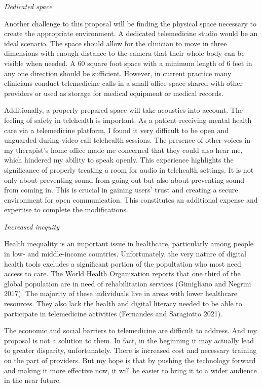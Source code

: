 \documentclass[
  letterpaper,
  DIV=11,
  numbers=noendperiod,
  oneside]{scrartcl}
\begin{document}
\emph{Dedicated space}

Another challenge to this proposal will be finding the physical space
necessary to create the appropriate environment. A dedicated
telemedicine studio would be an ideal scenario. The space should allow
for the clinician to move in three dimensions with enough distance to
the camera that their whole body can be visible when needed. A 60 square
foot space with a minimum length of 6 feet in any one direction should
be sufficient. However, in current practice many clinicians conduct
telemedicine calls in a small office space shared with other providers
or used as storage for medical equipment or medical records.

Additionally, a properly prepared space will take acoustics into
account. The feeling of safety in telehealth is important. As a patient
receiving mental health care via a telemedicine platform, I found it
very difficult to be open and unguarded during video call telehealth
sessions. The presence of other voices in my therapist's home office
made me concerned that they could also hear me, which hindered my
ability to speak openly. This experience highlights the significance of
properly treating a room for audio in telehealth settings. It is not
only about preventing sound from going out but also about preventing
sound from coming in. This is crucial in gaining users' trust and
creating a secure environment for open communication. This constitutes
an additional expense and expertise to complete the modifications.

\emph{Increased inequity}

Health inequality is an important issue in healthcare, particularly
among people in low- and middle-income countries. Unfortunately, the
very nature of digital health tools excludes a significant portion of
the popultation who most need access to care. The World Health
Organization reports that one third of the global population are in need
of rehabilitation services (Gimigliano and Negrini 2017). The majority
of these individuals live in areas with lower healthcare resources. They
also lack the health and digital literacy needed to be able to
participate in telemedicine activities (Fernandes and Saragiotto 2021).

The economic and social barriers to telemedicine are difficult to
address. And my proposal is not a solution to them. In fact, in the
beginning it may actually lead to greater disparity, unfortunately.
There is increased cost and necessary training on the part of providers.
But my hope is that by pushing the technology forward and making it more
effective now, it will be easier to bring it to a wider audience in the
near future.
\end{document}
